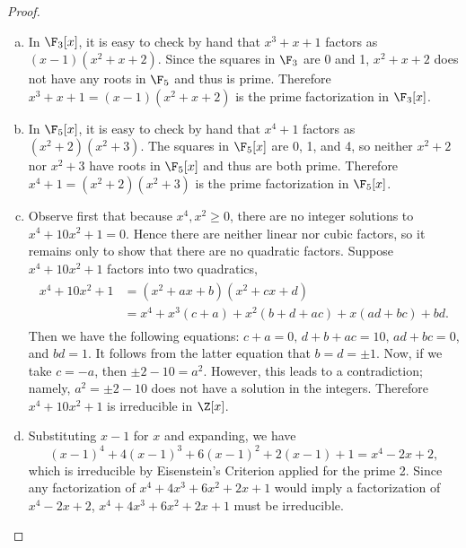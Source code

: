 \documentclass[10pt]{amsart}
\begin{document}
\begin{thm}
  \begin{proof}
    \begin{enumerate}[(a)]
    \item
      In $\F_3[x]$, it is easy to check by hand that $x^3 + x + 1$ factors as $(x-1)(x^2 + x + 2).$
      Since the squares in $\F_3$ are 0 and 1,  $x^2 + x + 2$ does not have any roots in $\F_5$ and thus is prime.
      Therefore $x^3 + x + 1 = (x-1)(x^2 + x + 2)$ is the prime factorization in $\F_3[x]$.
    \item
      In $\F_5[x]$, it is easy to check by hand that $x^4+1$ factors as $(x^2 + 2)(x^2 + 3)$.
      The squares in $\F_5[x]$ are 0, 1, and 4, so neither $x^2 + 2$ nor $x^2 + 3$ have roots in $\F_5[x]$ and thus are both prime.
      Therefore $x^4+1 = (x^2 + 2)(x^2 + 3)$ is the prime factorization in $\F_5[x]$.
    \item
      Observe first that because $x^4,x^2 \geq 0$, there are no integer solutions to $x^4 + 10x^2 + 1 = 0$.
      Hence there are neither linear nor cubic factors, so it remains only to show that there are no quadratic factors.
      Suppose $x^4 + 10x^2 + 1$ factors into two quadratics, 
      \begin{align*}
        \begin{split}
          x^4 + 10x^2 + 1 &= (x^2 + ax + b)(x^2 + cx + d)\\ &= x^4 + x^3(c+a)+x^2(b+d+ac) +x(ad+bc)+bd.
        \end{split}
      \end{align*}
      Then we have the following equations:  $c+a = 0,\, d+b+ac = 10,\, ad+bc=0$, and $bd = 1$.
      It follows from the latter equation that $b = d = \pm 1$.
      Now, if we take  $c = -a$, then $\pm 2 - 10 = a^2$.
      However, this leads to a contradiction; namely, $a^2 = \pm 2 - 10$ does not have a solution in the integers.
      Therefore $x^4 + 10x^2 + 1$ is irreducible in $\Z[x]$.
    \item
      Substituting $x-1$ for $x$ and expanding, we have $$(x-1)^4 + 4(x-1)^3 + 6(x-1)^2 + 2(x-1)+1 = x^4 - 2x + 2,$$ which is irreducible by Eisenstein's Criterion applied for the prime 2.  
      Since any factorization of $x^4 + 4x^3 + 6x^2 +2x + 1$ would imply a factorization of $x^4 - 2x + 2$, $x^4 + 4x^3 + 6x^2 +2x + 1$ must be irreducible.
    \end{enumerate}
  \end{proof}
\end{thm}
\end{document}
